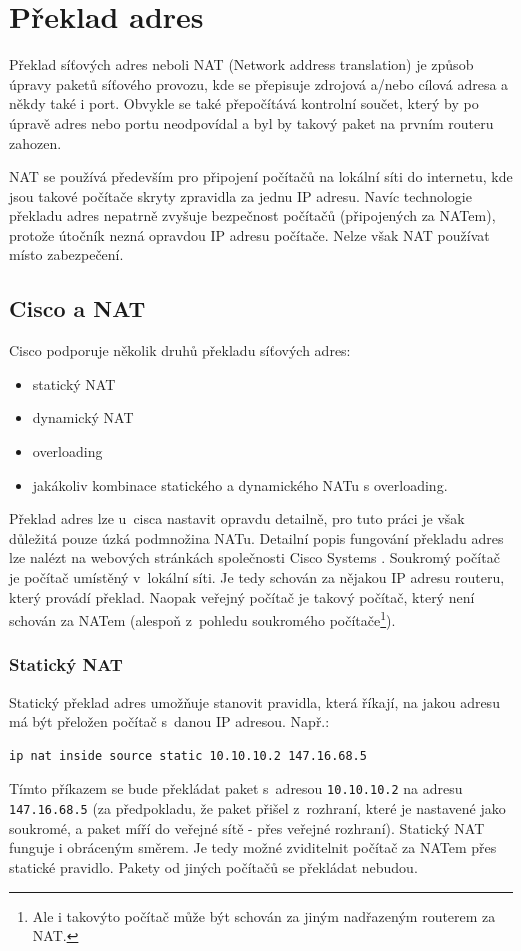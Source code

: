 \section{Překlad adres}

Překlad síťových adres neboli NAT (Network address translation) je způsob úpravy paketů síťového provozu, kde se přepisuje zdrojová a/nebo cílová adresa a někdy také i port. Obvykle se také přepočítává kontrolní součet, který by po úpravě adres nebo portu neodpovídal a byl by takový paket na prvním routeru zahozen.

NAT se používá především pro připojení počítačů na lokální síti do internetu, kde jsou takové počítače skryty zpravidla za jednu IP adresu. Navíc technologie překladu adres nepatrně zvyšuje bezpečnost počítačů (připojených za NATem), protože útočník nezná opravdou IP adresu  počítače. Nelze však NAT používat místo zabezpečení.


\subsection{Cisco a NAT}
Cisco podporuje několik druhů překladu \cite{cisco:druhy} síťových adres:

\begin{itemize}
\item statický NAT
\item dynamický NAT
\item overloading
\item jakákoliv kombinace statického a dynamického NATu s overloading.
\end{itemize}

Překlad adres lze u~cisca nastavit opravdu detailně, pro tuto práci je však důležitá pouze úzká podmnožina NATu. Detailní popis fungování překladu adres lze nalézt na webových stránkách společnosti Cisco Systems \cite{cisco:nat}.
Soukromý počítač je počítač umístěný v~lokální síti. Je tedy schován za nějakou IP adresu routeru, který provádí překlad. Naopak veřejný počítač je takový počítač, který není schován za NATem (alespoň z~pohledu soukromého počítače\footnote{Ale i takovýto počítač může být schován za jiným nadřazeným routerem za NAT.}).

\subsubsection{Statický NAT}
Statický překlad adres umožňuje stanovit pravidla, která říkají, na jakou adresu má být přeložen počítač s~danou IP adresou. Např.:
\begin{verbatim}
ip nat inside source static 10.10.10.2 147.16.68.5
\end{verbatim} 
Tímto příkazem se bude překládat paket s~adresou \verb|10.10.10.2| na adresu \verb|147.16.68.5| (za předpokladu, že paket přišel z~rozhraní, které je nastavené jako soukromé, a paket míří do veřejné sítě - přes veřejné rozhraní). Statický NAT funguje i obráceným směrem. Je tedy možné zviditelnit počítač za NATem přes statické pravidlo. Pakety od jiných počítačů se překládat nebudou. 

